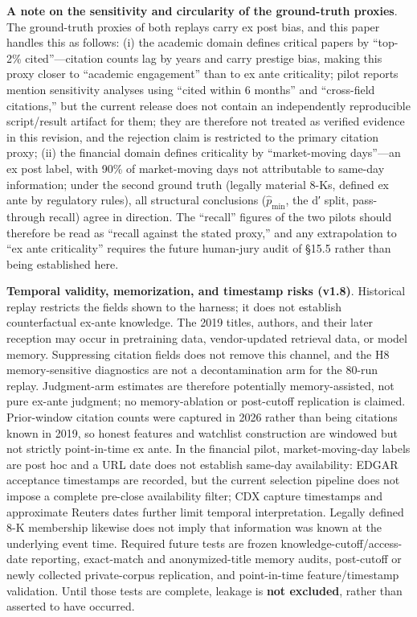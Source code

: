 \documentclass[
  11pt]{article}
\begin{document}
\textbf{A note on the sensitivity and circularity of the ground-truth
proxies}. The ground-truth proxies of both replays carry ex post bias,
and this paper handles this as follows: (i) the academic domain defines
critical papers by ``top-2\% cited''---citation counts lag by years and
carry prestige bias, making this proxy closer to ``academic engagement''
than to ex ante criticality; pilot reports mention sensitivity analyses
using ``cited within 6 months'' and ``cross-field citations,'' but the
current release does not contain an independently reproducible
script/result artifact for them; they are therefore not treated as
verified evidence in this revision, and the rejection claim is
restricted to the primary citation proxy; (ii) the financial domain
defines criticality by ``market-moving days''---an ex post label, with
90\% of market-moving days not attributable to same-day information;
under the second ground truth (legally material 8-Ks, defined ex ante by
regulatory rules), all structural conclusions (\(\hat p_{\min}\), the d′
split, pass-through recall) agree in direction. The ``recall'' figures
of the two pilots should therefore be read as ``recall against the
stated proxy,'' and any extrapolation to ``ex ante criticality''
requires the future human-jury audit of §15.5 rather than being
established here.

\textbf{Temporal validity, memorization, and timestamp risks (v1.8)}.
Historical replay restricts the fields shown to the harness; it does not
establish counterfactual ex-ante knowledge. The 2019 titles, authors,
and their later reception may occur in pretraining data, vendor-updated
retrieval data, or model memory. Suppressing citation fields does not
remove this channel, and the H8 memory-sensitive diagnostics are not a
decontamination arm for the 80-run replay. Judgment-arm estimates are
therefore potentially memory-assisted, not pure ex-ante judgment; no
memory-ablation or post-cutoff replication is claimed. Prior-window
citation counts were captured in 2026 rather than being citations known
in 2019, so honest features and watchlist construction are windowed but
not strictly point-in-time ex ante. In the financial pilot,
market-moving-day labels are post hoc and a URL date does not establish
same-day availability: EDGAR acceptance timestamps are recorded, but the
current selection pipeline does not impose a complete pre-close
availability filter; CDX capture timestamps and approximate Reuters
dates further limit temporal interpretation. Legally defined 8-K
membership likewise does not imply that information was known at the
underlying event time. Required future tests are frozen
knowledge-cutoff/access-date reporting, exact-match and anonymized-title
memory audits, post-cutoff or newly collected private-corpus
replication, and point-in-time feature/timestamp validation. Until those
tests are complete, leakage is \textbf{not excluded}, rather than
asserted to have occurred.
\end{document}
